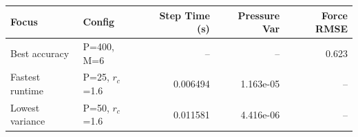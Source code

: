 \begin{tabular}{llrrr}
\toprule
Focus & Config & Step Time (s) & Pressure Var & Force RMSE \\
\midrule
Best accuracy & P=400, M=6 & -- & -- & 0.623 \\
Fastest runtime & P=25, $r_c$=1.6 & 0.006494 & 1.163e-05 & -- \\
Lowest variance & P=50, $r_c$=1.6 & 0.011581 & 4.416e-06 & -- \\
\bottomrule
\end{tabular}
